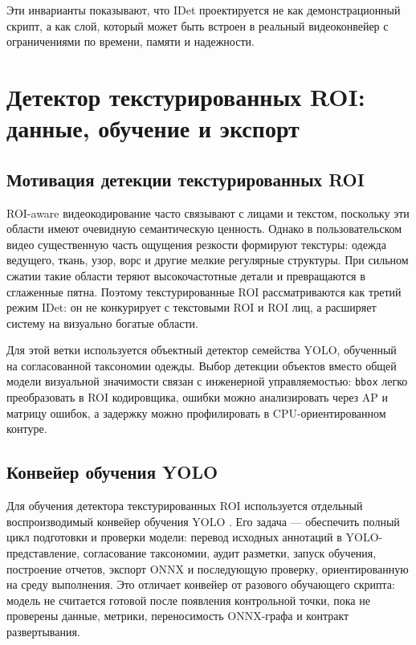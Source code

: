\documentclass[12pt,a4paper,oneside,openany]{report}
\begin{document}
Эти инварианты показывают, что IDet проектируется не как демонстрационный скрипт, а как слой, который может быть встроен в реальный видеоконвейер с ограничениями по времени, памяти и надежности.


\chapter{Детектор текстурированных ROI: данные, обучение и экспорт}

\section{Мотивация детекции текстурированных ROI}

ROI-aware видеокодирование часто связывают с лицами и текстом, поскольку эти области имеют очевидную семантическую ценность. Однако в пользовательском видео существенную часть ощущения резкости формируют текстуры: одежда ведущего, ткань, узор, ворс и другие мелкие регулярные структуры. При сильном сжатии такие области теряют высокочастотные детали и превращаются в сглаженные пятна. Поэтому текстурированные ROI рассматриваются как третий режим IDet: он не конкурирует с текстовыми ROI и ROI лиц, а расширяет систему на визуально богатые области.

Для этой ветки используется объектный детектор семейства YOLO, обученный на согласованной таксономии одежды. Выбор детекции объектов вместо общей модели визуальной значимости связан с инженерной управляемостью: \texttt{bbox} легко преобразовать в ROI кодировщика, ошибки можно анализировать через AP и матрицу ошибок, а задержку можно профилировать в CPU-ориентированном контуре.

\section{Конвейер обучения YOLO}

Для обучения детектора текстурированных ROI используется отдельный воспроизводимый конвейер обучения YOLO \cite{pipeline}. Его задача --- обеспечить полный цикл подготовки и проверки модели: перевод исходных аннотаций в YOLO-представление, согласование таксономии, аудит разметки, запуск обучения, построение отчетов, экспорт ONNX и последующую проверку, ориентированную на среду выполнения. Это отличает конвейер от разового обучающего скрипта: модель не считается готовой после появления контрольной точки, пока не проверены данные, метрики, переносимость ONNX-графа и контракт развертывания.
\end{document}
